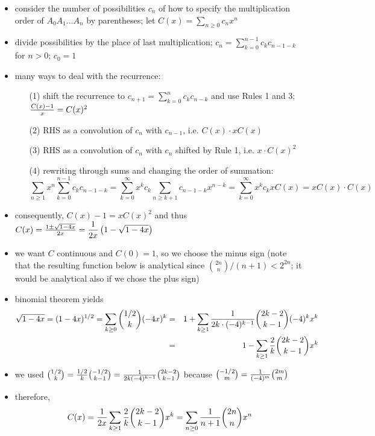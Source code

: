\documentclass[10pt, a4paper]{article}
\newcommand*\ruleline[1]{\par\noindent\raisebox{.8ex}{\makebox[\linewidth]{\hrulefill\hspace{1ex}\raisebox{-.8ex}{#1}\hspace{1ex}\hrulefill}}}
\begin{document}
\ruleline{Catalan numbers [Knuth 357, example 4]}
\begin{itemize}
    \item consider the number of possibilities $c_n$ of how to specify the multiplication order of $A_0A_1\dots A_n$ by parentheses; let $C(x)=\sum_{n\ge 0} c_nx^n$
    \item divide possibilities by the place of last multiplication; $c_n = \sum\limits_{k=0}^{n-1} c_kc_{n-1-k}$ for $n > 0$; $c_0=1$
    \item many ways to deal with the recurrence:
            \begin{itemize}
                \item[(1)] shift the recurrence to $c_{n+1} = \sum_{k=0}^n c_kc_{n-k}$ and use Rules 1 and 3; ${C(x)-1\over x} = C(x)^2$
                \item[(2)] RHS as a convolution of $c_n$ with $c_{n-1}$, i.e. $C(x)\cdot xC(x)$
                \item[(3)] RHS as a convolution of $c_n$ with $c_n$ shifted by Rule 1, i.e. $x\cdot C(x)^2$
                \item[(4)] rewriting through sums and changing the order of summation:
                    $$\sum_{n\ge 1}x^n\sum_{k=0}^{n-1}c_kc_{n-1-k}=\sum_{k=0}^\infty x^kc_k\sum_{n\ge k+1} c_{n-1-k}x^{n-k}=
                        \sum_{k=0}^\infty x^kc_k xC(x)=xC(x)\cdot C(x)$$
            \end{itemize}
    \item consequently, $C(x) - 1 = xC(x)^2$ and thus $C(x) = {1\pm \sqrt{1-4x}\over 2x}=\displaystyle {1\over 2x}\left(1 - \sqrt{1-4x}\right)$
    \item we want $C$ continuous and $C(0) = 1$, so we choose the minus sign (note that the resulting function below
            is analytical since ${2n\choose n}/(n+1) < 2^{2n}$; it would be analytical also if we chose the plus sign)
    \item binomial theorem yields
    \begin{eqnarray*}
        \sqrt{1-4x} = (1-4x)^{1/2} = \sum_{k\ge 0} {1/2\choose k}(-4x)^k &=& 1+\sum_{k\ge 1}{1\over 2k\cdot (-4)^{k-1}}{2k-2\choose k-1}(-4)^kx^k\\
        &=& 1 - \sum_{k\ge 1}{2\over k}{2k-2\choose k-1}x^k 
    \end{eqnarray*}
    \item we used ${1/2\choose k}={1/2\over k}{-1/2\choose k-1} = {1\over 2k(-4)^{k-1}}{2k-2\choose k-1}$ because ${-1/2\choose m}={1\over (-4)^m}{2m\choose m}$
    \item therefore, $$C(x)={1\over 2x}\sum_{k\ge 1}{2\over k}{2k-2\choose k-1}x^k = \sum_{n\ge 0}{1\over n+1}{2n\choose n}x^n$$
\end{itemize}
\end{document}
